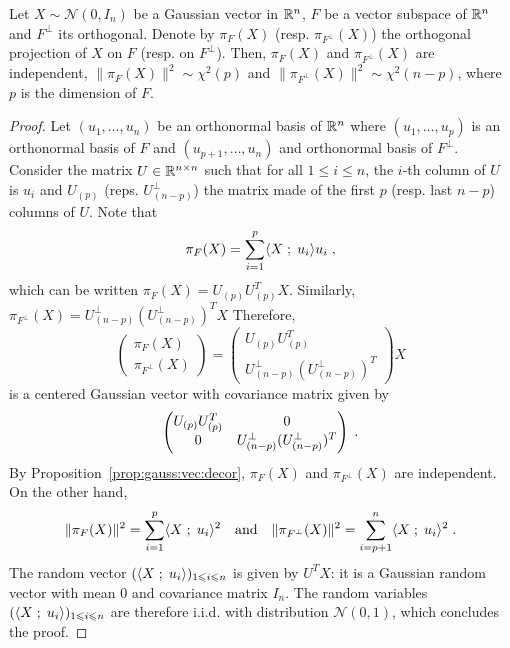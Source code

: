\begin{shaded}
\begin{theorem}[Cochran]
\label{th:cochran}
Let $X\sim \mathcal{N}(0,I_n)$ be a Gaussian vector in $\mathbb{R}^n$, $F$ be a vector subspace of $\mathbb{R}^n$ and $F^{\perp}$ its orthogonal. Denote by $\pi_F(X)$ (resp. $\pi_{F^{\perp}}(X)$) the orthogonal projection of $X$ on $F$ (resp. on $F^{\perp}$). Then,  $\pi_F(X)$ and $\pi_{F^{\perp}}(X)$ are independent, $\|\pi_F(X)\|^2\sim\chi^2(p)$ and $\|\pi_{F^{\perp}}(X)\|^2 \sim \chi^2(n-p)$, where $p$ is the dimension of $F$.
\end{theorem}
\end{shaded}
\begin{proof}
Let $(u_1,\ldots,u_n)$ be an orthonormal basis of $\mathbb{R}^n$ where $(u_1,\ldots,u_p)$ is an orthonormal basis of $F$ and $(u_{p+1},\ldots,u_n)$ and orthonormal basis of $F^{\perp}$. Consider the matrix $U\in\mathbb{R}^{n\times n}$ such that for all $1\leqslant i\leqslant n$, the $i$-th column of $U$ is $u_i$ and $U_{(p)}$ (reps. $U_{(n-p)}^{\perp}$) the matrix made of the first $p$ (resp. last $n-p$) columns of $U$. Note that
\[
\pi_F(X) = \sum_{i=1}^p \langle X\;;\; u_i\rangle u_i\;,
\]
which can be written $\pi_F(X) = U_{(p)}U_{(p)}^T X$. Similarly, $\pi_{F^{\perp}}(X) = U^{\perp}_{(n-p)}(U^{\perp}_{(n-p)})^T X$
Therefore,
\[
\begin{pmatrix}\pi_F(X)\\ \pi_{F^{\perp}}(X)\end{pmatrix}  = \begin{pmatrix} U_{(p)}U_{(p)}^T \\ U^{\perp}_{(n-p)}(U^{\perp}_{(n-p)})^T\end{pmatrix}X
\]
is a centered Gaussian vector with covariance matrix given by
\[
 \begin{pmatrix} U_{(p)}U_{(p)}^T &  0 \\ 0 & U^{\perp}_{(n-p)}(U^{\perp}_{(n-p)})^T\end{pmatrix}\;.
\]
By Proposition~\ref{prop:gauss:vec:decor}, $\pi_F(X)$ and $\pi_{F^{\perp}}(X)$ are independent. On the other hand,
\[
\|\pi_F(X)\|^2 = \sum_{i=1}^p \langle X\;;\; u_i\rangle^2 \quad\mathrm{and} \quad \|\pi_{F^{\perp}}(X)\|^2 = \sum_{i=p+1}^n \langle X\;;\; u_i\rangle^2\;. 
\]
The random vector $(\langle X\;;\; u_i\rangle)_{1\leqslant i \leqslant n}$ is given by $U^TX$: it is a Gaussian random vector with mean $0$ and covariance matrix $I_n$. The random variables $(\langle X\;;\; u_i\rangle)_{1\leqslant i \leqslant n}$ are therefore i.i.d. with distribution $\mathcal{N}(0,1)$, which concludes the proof.
\end{proof}

